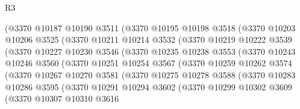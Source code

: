 \begin{lexlean}{R3}
\begin{coremodule}
                  (@3370
                    @10187
                    @10190
                    @3511
                    (@3370
                      @10195
                      @10198
                      @3518
                      (@3370
                        @10203
                        @10206
                        @3525
                        (@3370
                          @10211
                          @10214
                          @3532
                          (@3370
                            @10219
                            @10222
                            @3539
                            (@3370
                              @10227
                              @10230
                              @3546
                              (@3370
                                @10235
                                @10238
                                @3553
                                (@3370
                                  @10243
                                  @10246
                                  @3560
                                  (@3370
                                    @10251
                                    @10254
                                    @3567
                                    (@3370
                                      @10259
                                      @10262
                                      @3574
                                      (@3370
                                        @10267
                                        @10270
                                        @3581
                                        (@3370
                                          @10275
                                          @10278
                                          @3588
                                          (@3370
                                            @10283
                                            @10286
                                            @3595
                                            (@3370
                                              @10291
                                              @10294
                                              @3602
                                              (@3370
                                                @10299
                                                @10302
                                                @3609
                                                (@3370
                                                  @10307
                                                  @10310
                                                  @3616

\end{coremodule}
\end{lexlean}
